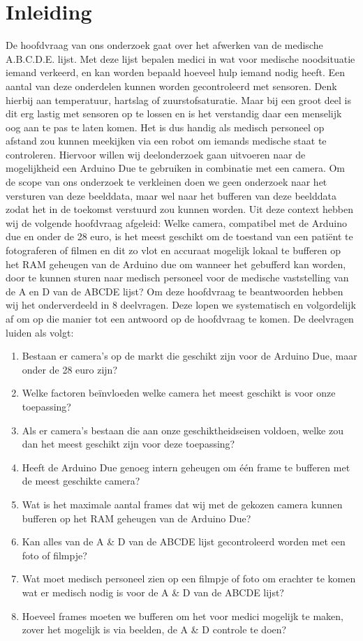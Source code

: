 \documentclass{article}
\begin{document}
\section{Inleiding}
De hoofdvraag van ons onderzoek gaat over het afwerken van de medische A.B.C.D.E. lijst. Met deze lijst bepalen medici in wat voor medische noodsituatie iemand verkeerd, en kan worden bepaald hoeveel hulp iemand nodig heeft. Een aantal van deze onderdelen kunnen worden gecontroleerd met sensoren. Denk hierbij aan temperatuur, hartslag of zuurstofsaturatie. Maar bij een groot deel is dit erg lastig met sensoren op te lossen en is het verstandig daar een menselijk oog aan te pas te laten komen. Het is dus handig als medisch personeel op afstand zou kunnen meekijken via een robot om iemands medische staat te controleren. Hiervoor willen wij deelonderzoek gaan uitvoeren naar de mogelijkheid een Arduino Due te gebruiken in combinatie met een camera. Om de scope van ons onderzoek te verkleinen doen we geen onderzoek naar het versturen van deze beelddata, maar wel naar het bufferen van deze beelddata zodat het in de toekomst verstuurd zou kunnen worden. 
Uit deze context hebben wij de volgende hoofdvraag afgeleid: 
Welke camera, compatibel met de Arduino due en onder de 28 euro, is het meest geschikt om de toestand van een patiënt te fotograferen of filmen en dit zo vlot en accuraat mogelijk lokaal te bufferen op het RAM geheugen van de Arduino due om wanneer het gebufferd kan worden, door te kunnen sturen naar medisch personeel voor de medische vaststelling van de A en D van de ABCDE lijst? 
Om deze hoofdvraag te beantwoorden hebben wij het onderverdeeld in 8 deelvragen. Deze lopen we systematisch en volgordelijk af om op die manier tot een antwoord op de hoofdvraag te komen. De deelvragen luiden als volgt:
\begin{enumerate}
	\item Bestaan er camera’s op de markt die geschikt zijn voor de Arduino Due, maar onder de 28 euro zijn?
	\item Welke factoren beïnvloeden welke camera het meest geschikt is voor onze toepassing? 
	\item Als er camera’s bestaan die aan onze geschiktheidseisen voldoen, welke zou dan het meest geschikt zijn voor deze toepassing? 
	\item Heeft de Arduino Due genoeg intern geheugen om één frame te bufferen met de meest geschikte camera? 
	\item Wat is het maximale aantal frames dat wij met de gekozen camera kunnen bufferen op het RAM geheugen van de Arduino Due? 
	\item Kan alles van de A {\&} D van de ABCDE lijst gecontroleerd worden met een foto of filmpje? 
	\item Wat moet medisch personeel zien op een filmpje of foto om erachter te komen wat er medisch nodig is voor de A {\&} D van de ABCDE lijst? 
	\item Hoeveel frames moeten we bufferen om het voor medici mogelijk te maken, zover het mogelijk is via beelden, de A {\&} D controle te doen? 
\end{enumerate}
\end{document}
